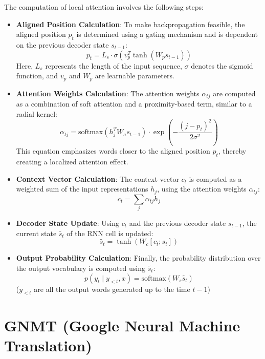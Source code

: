 The computation of local attention involves the following steps:

\begin{itemize}
    
    \item \textbf{Aligned Position Calculation}:
    To make backpropagation feasible, the aligned position $p_t$ is determined using a gating mechanism and is dependent on the previous decoder state $s_{t-1}$:
    $$
    p_t = L_s \cdot \sigma(v^T_p \tanh(W_p s_{t-1}))
    $$
    Here, $L_s$ represents the length of the input sequence, $\sigma$ denotes the sigmoid function, and $v_p$ and $W_p$ are learnable parameters.
    \vspace{0.25cm}
    
    \item \textbf{Attention Weights Calculation}:
    The attention weights $\alpha_{tj}$ are computed as a combination of soft attention and a proximity-based term, similar to a radial kernel:
    $$
    \alpha_{tj} = \text{softmax}(h_j^T W_a s_{t-1}) \cdot \exp\left(-\frac{(j - p_t)^2}{2\sigma^2}\right)
    $$
    This equation emphasizes words closer to the aligned position $p_t$, thereby creating a localized attention effect.
    \vspace{0.25cm}
    
    \item \textbf{Context Vector Calculation}:
    The context vector $c_t$ is computed as a weighted sum of the input representations $h_j$, using the attention weights $\alpha_{tj}$:
    $$\label{eq:local-attention}
    c_t = \sum_{j} \alpha_{tj} h_j
    $$
    
    \item \textbf{Decoder State Update}:
    Using $c_t$ and the previous decoder state $s_{t-1}$, the current state $\widetilde{s_t}$ of the RNN cell is updated:
    $$
    \widetilde{s_t} = \tanh(W_c [c_t; s_t])
    $$
    
    \item \textbf{Output Probability Calculation}:
    Finally, the probability distribution over the output vocabulary is computed using $\widetilde{s_t}$:
    $$
    p(y_t \mid y_{<t}, x) = \text{softmax}(W_s \widetilde{s_t})
    $$
    ($y_{<t}$ are all the output words generated up to the time $t-1$)

\end{itemize}


\section{GNMT (Google Neural Machine Translation)}


